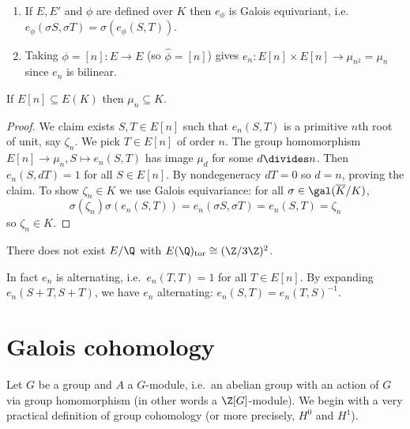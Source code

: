 \documentclass[a4paper]{article}
\theoremstyle{definition}
\theoremstyle{theorem}
\begin{document}
\begin{remark}\leavevmode
  \begin{enumerate}
  \item If \(E, E'\) and \(\phi\) are defined over \(K\) then \(e_\phi\) is Galois equivariant, i.e.\ \(e_\phi(\sigma S, \sigma T) = \sigma(e_\phi(S, T))\).
  \item Taking \(\phi = [n]: E \to E\) (so \(\hat \phi = [n]\)) gives \(e_n: E[n] \times E[n] \to \mu_{n^2} = \mu_n\) since \(e_n\) is bilinear.
  \end{enumerate}
\end{remark}

\begin{corollary}
  If \(E[n] \subseteq E(K)\) then \(\mu_n \subseteq K\).
\end{corollary}

\begin{proof}
  We claim exists \(S, T \in E[n]\) such that \(e_n(S, T)\) is a primitive \(n\)th root of unit, say \(\zeta_n\). We pick \(T \in E[n]\) of order \(n\). The group homomorphism \(E[n] \to \mu_n, S \mapsto e_n(S, T)\) has image \(\mu_d\) for some \(d \divides n\). Then \(e_n(S, dT) = 1\) for all \(S \in E[n]\). By nondegeneracy \(dT = 0\) so \(d = n\), proving the claim. To show \(\zeta_n \in K\) we use Galois equivariance: for all \(\sigma \in \gal(\overline K/K)\),
  \[
    \sigma(\zeta_n) \sigma(e_n(S, T)) = e_n(\sigma S, \sigma T) = e_n(S, T) = \zeta_n
  \]
  so \(\zeta_n \in K\).
\end{proof}

\begin{eg}
  There does not exist \(E/\Q\) with \(E(\Q)_{\mathrm{tor}} \cong (\Z/3\Z)^2\).
\end{eg}

\begin{remark}
  In fact \(e_n\) is alternating, i.e.\ \(e_n(T, T) = 1\) for all \(T \in E[n]\). By expanding \(e_n(S + T, S + T)\), we have \(e_n\) alternating: \(e_n(S, T) = e_n(T, S)^{-1}\).
\end{remark}

\section{Galois cohomology}

Let \(G\) be a group and \(A\) a \(G\)-module, i.e.\ an abelian group with an action of \(G\) via group homomorphism (in other words a \(\Z[G]\)-module). We begin with a very practical definition of group cohomology (or more precisely, \(H^0\) and \(H^1\)).
\end{document}
